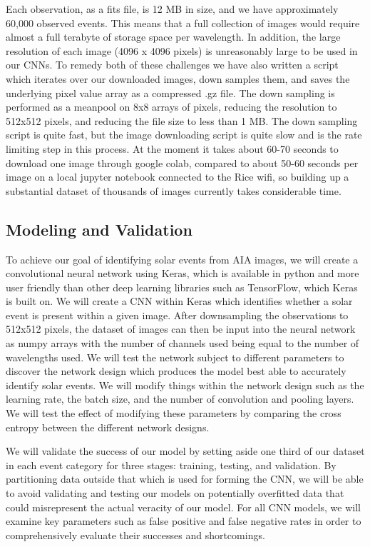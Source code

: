 \documentclass[12pt, letterpaper]{article}
\begin{document}
Each observation, as a fits file, is 12 MB in size, and we have approximately 60,000 observed events. This means that a full collection of images would require almost a full terabyte of storage space per wavelength. In addition, the large resolution of each image (4096 x 4096 pixels) is unreasonably large to be used in our CNNs. To remedy both of these challenges we have also written a script which iterates over our downloaded images, down samples them, and saves the underlying pixel value array as a compressed .gz file. The down sampling is performed as a meanpool on 8x8 arrays of pixels, reducing the resolution to 512x512 pixels, and reducing the file size to less than 1 MB. The down sampling script is quite fast, but the image downloading script is quite slow and is the rate limiting step in this process. At the moment it takes about 60-70 seconds to download one image through google colab, compared to about 50-60 seconds per image on a local jupyter notebook connected to the Rice wifi, so building up a substantial dataset of thousands of images currently takes considerable time.


\subsection*{Modeling and Validation}

To achieve our goal of identifying solar events from AIA images, we will create a convolutional neural network using Keras, which is available in python and more user friendly than other deep learning libraries such as TensorFlow, which Keras is built on. We will create a CNN within Keras which identifies whether a solar event is present within a given image. After downsampling the observations to 512x512 pixels, the dataset of images can then be input into the neural network as numpy arrays with the number of channels used being equal to the number of wavelengths used. We will test the network subject to different parameters to discover the network design which produces the model best able to accurately identify solar events. We will modify things within the network design such as the learning rate, the batch size, and the number of convolution and pooling layers. We will test the effect of modifying these parameters by comparing the cross entropy between the different network designs.

We will validate the success of our model by setting aside one third of our dataset in each event category for three stages: training, testing, and validation. By partitioning data outside that which is used for forming the CNN, we will be able to avoid validating and testing our models on potentially overfitted data that could misrepresent the actual veracity of our model. For all CNN models, we will examine key parameters such as false positive and false negative rates in order to comprehensively evaluate their successes and shortcomings.
\end{document}
